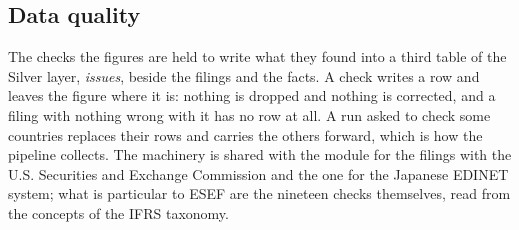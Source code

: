 \subsection{Data quality}

The checks the figures are held to write what they found into a third table of the Silver layer, \emph{issues}, beside the filings and the facts. A check writes a row and leaves the figure where it is: nothing is dropped and nothing is corrected, and a filing with nothing wrong with it has no row at all. A run asked to check some countries replaces their rows and carries the others forward, which is how the pipeline collects. The machinery is shared with the module for the filings with the U.S. Securities and Exchange Commission and the one for the Japanese EDINET system; what is particular to ESEF are the nineteen checks themselves, read from the concepts of the IFRS taxonomy.

